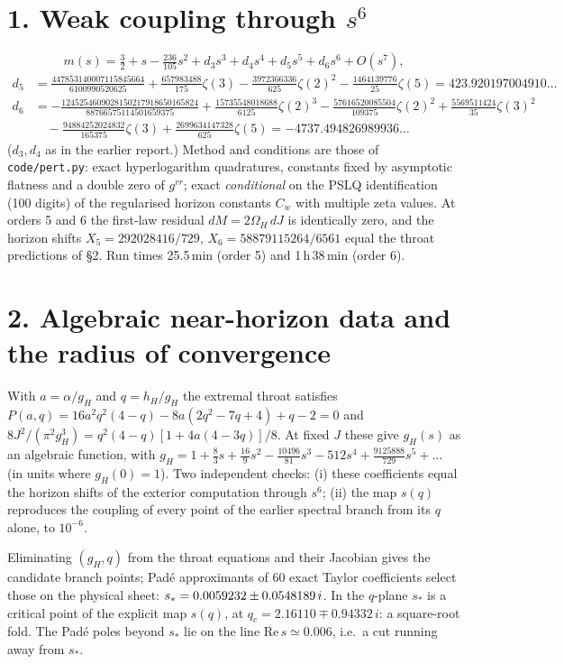 \documentclass[10pt,a4paper]{article}
\begin{document}
\section*{1. Weak coupling through $s^6$}
\[
m(s)=\tfrac32+s-\tfrac{236}{105}s^2+d_3s^3+d_4s^4+d_5s^5+d_6s^6+O(s^7),
\]
\begin{align*}
d_5&=\tfrac{447853140007115845664}{6100990520625}+\tfrac{657983488}{175}\zeta(3)
-\tfrac{3972366336}{625}\zeta(2)^2-\tfrac{1464139776}{25}\zeta(5)=423.920197004910\ldots\\
d_6&=-\tfrac{1245254609028150217918650165824}{88766575114501659375}
+\tfrac{15735548018688}{6125}\zeta(2)^3-\tfrac{57616520085504}{109375}\zeta(2)^2
+\tfrac{5569511424}{35}\zeta(3)^2\\
&\quad-\tfrac{94884252024832}{165375}\zeta(3)+\tfrac{2699634147328}{625}\zeta(5)
=-4737.494826989936\ldots
\end{align*}
($d_3,d_4$ as in the earlier report.) Method and conditions are those of
\texttt{code/pert.py}: exact hyperlogarithm quadratures, constants fixed by asymptotic flatness
and a double zero of $g^{rr}$; exact \emph{conditional} on the PSLQ identification (100 digits)
of the regularised horizon constants $C_w$ with multiple zeta values. At orders 5 and 6
the first-law residual $dM=2\Omega_H\,dJ$ is identically zero, and the horizon shifts
$X_5=292028416/729$, $X_6=58879115264/6561$ equal the throat predictions of \S2.
Run times 25.5\,min (order 5) and 1\,h\,38\,min (order 6).

\section*{2. Algebraic near-horizon data and the radius of convergence}
With $a=\alpha/g_H$ and $q=h_H/g_H$ the extremal throat satisfies
$P(a,q)=16a^2q^2(4-q)-8a(2q^2-7q+4)+q-2=0$ and
$8J^2/(\pi^2g_H^3)=q^2(4-q)[1+4a(4-3q)]/8$.
At fixed $J$ these give $g_H(s)$ as an algebraic function, with
$g_H=1+\tfrac83 s+\tfrac{16}9 s^2-\tfrac{10496}{81}s^3-512 s^4+\tfrac{9125888}{729}s^5+\dots$
(in units where $g_H(0)=1$). Two independent checks: (i) these coefficients equal the
horizon shifts of the exterior computation through $s^6$; (ii) the map $s(q)$ reproduces
the coupling of every point of the earlier spectral branch from its $q$ alone, to $10^{-6}$.

Eliminating $(g_H,q)$ from the throat equations and their Jacobian gives the candidate branch
points; Pad\'e approximants of 60 exact Taylor coefficients select those on the physical
sheet: $s_*=0.0059232\pm0.0548189\,i$. In the $q$-plane $s_*$ is a critical point of the explicit
map $s(q)$, at $q_c=2.16110\mp0.94332\,i$: a square-root fold. The Pad\'e poles beyond
$s_*$ lie on the line $\mathrm{Re}\,s\simeq0.006$, i.e.\ a cut running away from $s_*$.
\end{document}
